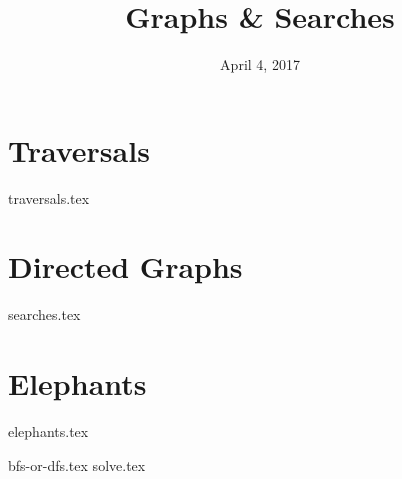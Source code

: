 \documentclass{exam}
\title{Graphs \& Searches}
\date{April 4, 2017}
\begin{document}
\maketitle

\section{Traversals}
\begin{questions}
{traversals.tex}
\end{questions}

\section{Directed Graphs}
\begin{questions}
{searches.tex}
\end{questions}

\clearpage

\section{Elephants}
{elephants.tex}
\begin{questions}
{bfs-or-dfs.tex}
{solve.tex}
\end{questions}
\end{document}
